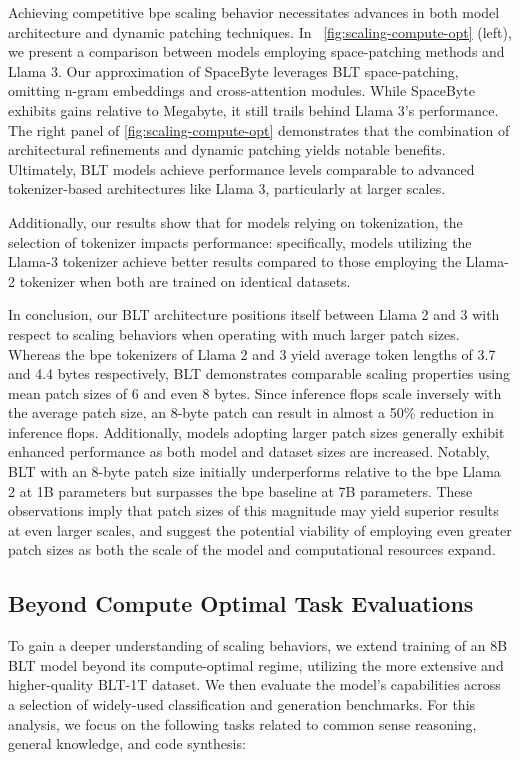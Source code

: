 Achieving competitive bpe scaling behavior necessitates advances in both model architecture and dynamic patching techniques. In ~\autoref{fig:scaling-compute-opt} (left), we present a comparison between models employing space-patching methods and Llama 3. Our approximation of SpaceByte \citep{slagle2024spacebyte} leverages {\textsc BLT} space-patching, omitting n-gram embeddings and cross-attention modules. While SpaceByte exhibits gains relative to Megabyte, it still trails behind Llama 3's performance. The right panel of \autoref{fig:scaling-compute-opt} demonstrates that the combination of architectural refinements and dynamic patching yields notable benefits. Ultimately, {\textsc BLT} models achieve performance levels comparable to advanced tokenizer-based architectures like Llama 3, particularly at larger scales.

Additionally, our results show that for models relying on tokenization, the selection of tokenizer impacts performance: specifically, models utilizing the Llama-3 tokenizer achieve better results compared to those employing the Llama-2 tokenizer when both are trained on identical datasets.

In conclusion, our {\textsc BLT} architecture positions itself between Llama 2 and 3 with respect to scaling behaviors when operating with much larger patch sizes. Whereas the bpe tokenizers of Llama 2 and 3 yield average token lengths of 3.7 and 4.4 bytes respectively, {\textsc BLT} demonstrates comparable scaling properties using mean patch sizes of 6 and even 8 bytes. Since inference flops scale inversely with the average patch size, an 8-byte patch can result in almost a 50\% reduction in inference flops. Additionally, models adopting larger patch sizes generally exhibit enhanced performance as both model and dataset sizes are increased. Notably, {\textsc BLT} with an 8-byte patch size initially underperforms relative to the bpe Llama 2 at 1B parameters but surpasses the bpe baseline at 7B parameters. These observations imply that patch sizes of this magnitude may yield superior results at even larger scales, and suggest the potential viability of employing even greater patch sizes as both the scale of the model and computational resources expand.

\subsection{Beyond Compute Optimal Task Evaluations}
\label{section:evals}
To gain a deeper understanding of scaling behaviors, we extend training of an 8B {\textsc BLT} model beyond its compute-optimal regime, utilizing the more extensive and higher-quality {\textsc BLT}-1T dataset. We then evaluate the model’s capabilities across a selection of widely-used classification and generation benchmarks. For this analysis, we focus on the following tasks related to common sense reasoning, general knowledge, and code synthesis:
